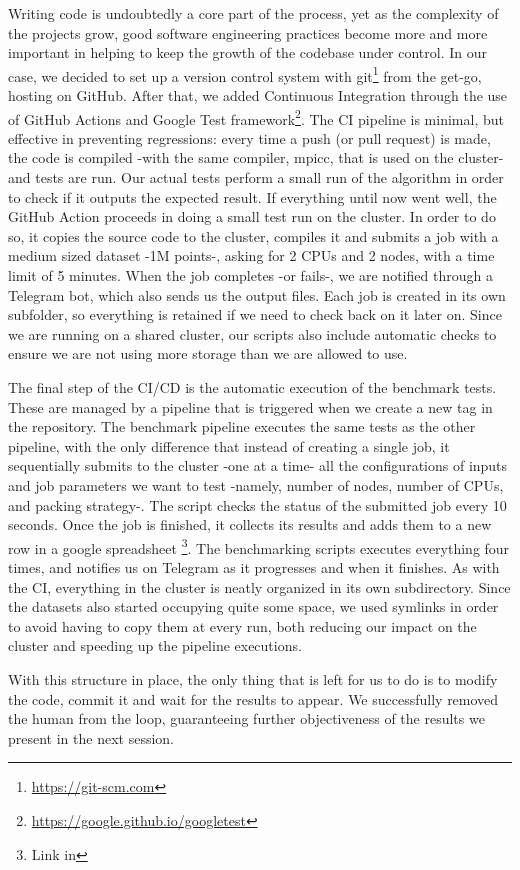 Writing code is undoubtedly a core part of the process, yet as the complexity of the projects grow, good software engineering practices become more and more important in helping to keep the growth of the codebase under control.
In our case, we decided to set up a version control system with git\footnote{\url{https://git-scm.com}} from the get-go, hosting on GitHub. After that, we added Continuous Integration through the use of GitHub Actions and Google Test framework\footnote{\url{https://google.github.io/googletest}}. The CI pipeline is minimal, but effective in preventing regressions: every time a push (or pull request) is made, the code is compiled -with the same compiler, mpicc, that is used on the cluster- and tests are run. Our actual tests perform a small run of the algorithm in order to check if it outputs the expected result. If everything until now went well, the GitHub Action proceeds in doing a small test run on the cluster. In order to do so, it copies the source code to the cluster, compiles it and submits a job with a medium sized dataset -1M points-, asking for 2 CPUs and 2 nodes, with a time limit of 5 minutes. When the job completes -or fails-, we are notified through a Telegram bot, which also sends us the output files. Each job is created in its own subfolder, so everything is retained if we need to check back on it later on.
Since we are running on a shared cluster, our scripts also include automatic checks to ensure we are not using more storage than we are allowed to use.

The final step of the CI/CD is the automatic execution of the benchmark tests. These are managed by a pipeline that is triggered when we create a new tag in the repository.
The benchmark pipeline executes the same tests as the other pipeline, with the only difference that instead of creating a single job, it sequentially submits to the cluster -one at a time- all the configurations of inputs and job parameters we want to test -namely, number of nodes, number of CPUs, and packing strategy-. The script checks the status of the submitted job every 10 seconds. Once the job is finished, it collects its results and adds them to a new row in a google spreadsheet
\footnote{Link in }.
The benchmarking scripts executes everything four times, and notifies us on Telegram as it progresses and when it finishes.
As with the CI, everything in the cluster is neatly organized in its own subdirectory.
Since the datasets also started occupying quite some space, we used symlinks in order to avoid having to copy them at every run, both reducing our impact on the cluster and speeding up the pipeline executions.

With this structure in place, the only thing that is left for us to do is to modify the code, commit it and wait for the results to appear. We successfully removed the human from the loop, guaranteeing further objectiveness of the results we present in the next session.
